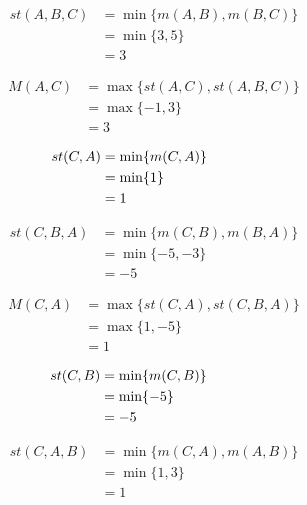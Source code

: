 \begin{align}
st (A, B, C)&= \min \lbrace m (A, B), m (B, C) \rbrace  \nonumber \\
                     &= \min \lbrace 3, 5 \rbrace \nonumber \\
                     &= 3\nonumber
\end{align}

\begin{align}
M (A, C)&=  \max \lbrace st (A, C), st(A, B, C) \rbrace \nonumber \\
                     &= \max \lbrace -1, 3 \rbrace \nonumber \\
                     &= 3\nonumber
\end{align}


\begin{align}
\hspace{-3cm} st (C, A)&=  \min \lbrace m (C, A) \rbrace  \nonumber \\
					  &= \min \lbrace 1 \rbrace  \nonumber \\
                     &= 1 \nonumber
\end{align}


\begin{align}
st (C, B, A)&= \min \lbrace m (C, B), m (B, A) \rbrace  \nonumber \\
                     &= \min \lbrace -5, -3 \rbrace \nonumber \\
                     &= -5\nonumber
\end{align}

\begin{align}
M (C, A)&=  \max \lbrace st (C, A), st(C, B, A) \rbrace \nonumber \\
                     &= \max \lbrace 1, -5 \rbrace \nonumber \\
                     &= 1\nonumber
\end{align}





\begin{align}
\hspace{-3cm} st (C, B)&=  \min \lbrace m (C, B) \rbrace  \nonumber \\
					  &= \min \lbrace -5 \rbrace  \nonumber \\
                     &= -5 \nonumber
\end{align}


\begin{align}
st (C, A, B)&= \min \lbrace m (C, A), m (A, B) \rbrace  \nonumber \\
                     &= \min \lbrace 1, 3\rbrace \nonumber \\
                     &= 1\nonumber
\end{align}

